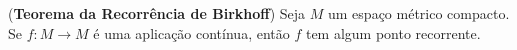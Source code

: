 %
%
%
%
%
%
%
%
%
%

\begin{corolario}\label{trb} (\textbf{Teorema da Recorrência de Birkhoff}) Seja $M$ um espaço métrico compacto. Se $f:M\to M$ é uma aplicação contínua, então $f$ tem algum ponto recorrente.
\end{corolario}

